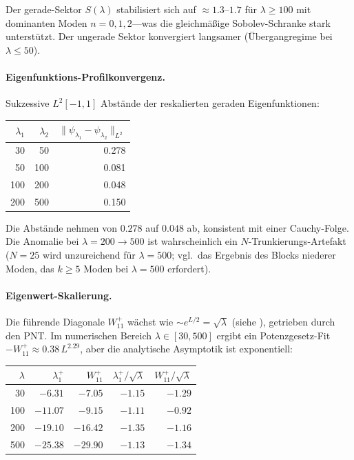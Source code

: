 ﻿\documentclass[12pt,a4paper]{article}
\theoremstyle{definition}
\theoremstyle{remark}
\begin{document}
\noindent Der gerade-Sektor $S(\lambda)$ stabilisiert sich auf $\approx 1.3$--$1.7$ für $\lambda \geq 100$ mit dominanten Moden $n = 0, 1, 2$---was die gleichmäßige Sobolev-Schranke stark unterstützt. Der ungerade Sektor konvergiert langsamer (Übergangregime bei $\lambda \leq 50$).

\paragraph{Eigenfunktions-Profilkonvergenz.}
Sukzessive $L^2[-1,1]$ Abstände der reskalierten geraden Eigenfunktionen:

\begin{center}
\begin{tabular}{r@{${}\to{}$}r|r}
$\lambda_1$ & $\lambda_2$ & $\|\psi_{\lambda_1} - \psi_{\lambda_2}\|_{L^2}$ \\\hline
30  & 50  & 0.278 \\
50  & 100 & 0.081 \\
100 & 200 & 0.048 \\
200 & 500 & 0.150
\end{tabular}
\end{center}

\noindent Die Abstände nehmen von $0.278$ auf $0.048$ ab, konsistent mit einer Cauchy-Folge. Die Anomalie bei $\lambda = 200 \to 500$ ist wahrscheinlich ein $N$-Trunkierungs-Artefakt ($N = 25$ wird unzureichend für $\lambda = 500$; vgl.\ das Ergebnis des Blocks niederer Moden, das $k \geq 5$ Moden bei $\lambda = 500$ erfordert).

\paragraph{Eigenwert-Skalierung.}
Die führende Diagonale $W_{11}^+$ wächst wie $\sim e^{L/2} = \sqrt{\lambda}$ (siehe ), getrieben durch den PNT. Im numerischen Bereich $\lambda \in [30, 500]$ ergibt ein Potenzgesetz-Fit $-W_{11}^+ \approx 0.38\,L^{2.29}$, aber die analytische Asymptotik ist exponentiell:

\begin{center}
\begin{tabular}{r|r|r|r|r}
$\lambda$ & $\lambda_1^+$ & $W_{11}^+$ & $\lambda_1^+ / \sqrt{\lambda}$ & $W_{11}^+ / \sqrt{\lambda}$ \\\hline
30  & $-6.31$  & $-7.05$  & $-1.15$ & $-1.29$ \\
100 & $-11.07$ & $-9.15$  & $-1.11$ & $-0.92$ \\
200 & $-19.10$ & $-16.42$ & $-1.35$ & $-1.16$ \\
500 & $-25.38$ & $-29.90$ & $-1.13$ & $-1.34$
\end{tabular}
\end{center}
\end{document}
